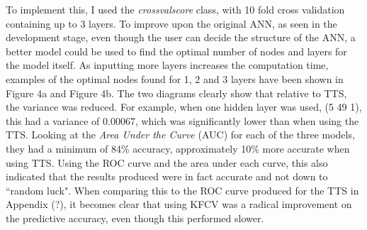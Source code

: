 \documentclass[11pt]{article}
\begin{document}
To implement this, I used the \textit{cross\textunderscore val\textunderscore score} class, with 10 fold cross validation containing up to 3 layers. To improve upon the original ANN, as seen in the development stage, even though the user can decide the structure of the ANN, a better model could be used to find the optimal number of nodes and layers for the model itself. As inputting more layers increases the computation time, examples of the optimal nodes found for 1, 2 and 3 layers have been shown in Figure 4a and Figure 4b. 
The two diagrams clearly show that relative to TTS, the variance was reduced. For example, when one hidden layer was used, (5 49 1), this had a variance of 0.00067, which was significantly lower than when using the TTS. Looking at the \textit{Area Under the Curve} (AUC) for each of the three models, they had a minimum of 84\% accuracy, approximately 10\% more accurate when using TTS. Using the ROC curve and the area under each curve, this also indicated that the results produced were in fact accurate and not down to ``random luck". When comparing this to the ROC curve produced for the TTS in Appendix (?), it becomes clear that using KFCV was a radical improvement on the predictive accuracy, even though this performed slower. 
\end{document}
